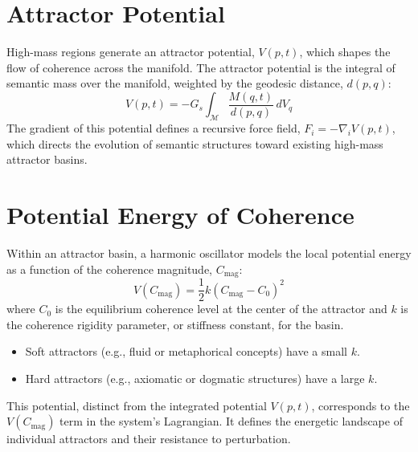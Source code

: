 \section{Attractor Potential}

High-mass regions generate an attractor potential, \(V(p,t)\), which shapes the flow of coherence across the manifold. The attractor potential is the integral of semantic mass over the manifold, weighted by the geodesic distance, \(d(p,q)\):
\begin{equation}
V(p, t) = -G_s \int_{\mathcal{M}} \frac{M(q, t)}{d(p, q)} \, dV_q
\end{equation}
The gradient of this potential defines a recursive force field, \(F_i = -\nabla_i V(p,t)\), which directs the evolution of semantic structures toward existing high-mass attractor basins.

\section{Potential Energy of Coherence}

Within an attractor basin, a harmonic oscillator models the local potential energy as a function of the coherence magnitude, \(C_{\text{mag}}\):
\begin{equation}
V(C_{\text{mag}}) = \frac{1}{2}k(C_{\text{mag}} - C_0)^2
\end{equation}
where \(C_0\) is the equilibrium coherence level at the center of the attractor and \(k\) is the coherence rigidity parameter, or stiffness constant, for the basin.
\begin{itemize}
    \item Soft attractors (e.g., fluid or metaphorical concepts) have a small \(k\).
    \item Hard attractors (e.g., axiomatic or dogmatic structures) have a large \(k\).
\end{itemize}
This potential, distinct from the integrated potential \(V(p,t)\), corresponds to the \(V(C_{\text{mag}})\) term in the system's Lagrangian. It defines the energetic landscape of individual attractors and their resistance to perturbation. 
